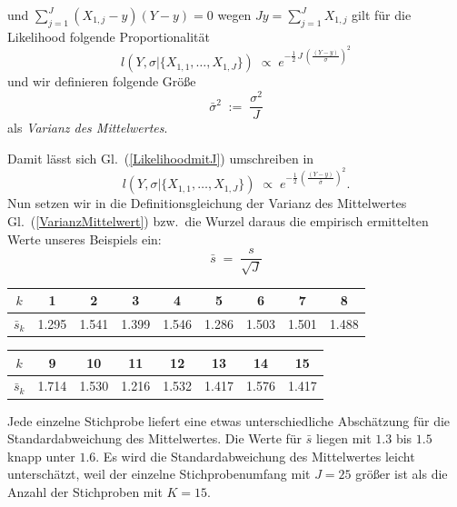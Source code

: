 und $\sum\limits_{j=1}^J (X_{1,j} - y) (Y - y) = 0$ wegen $J y = \sum\limits_{j=1}^J X_{1,j}$
gilt für die Likelihood folgende Proportionalität
\begin{equation}
l(Y, \sigma | \{X_{1,1}, \dots, X_{1,J}\}) \; \propto \;
 e^{- \frac{1}{2} \, J \, \left( \frac{(Y - y)}{\sigma} \right)^2 }
\label{LikelihoodmitJ}
\end{equation}
und wir definieren folgende Größe
\begin{equation}
\bar \sigma^2 \; := \; \frac{\sigma^2}{J}
\label{VarianzMittelwert}
\end{equation}
als \textsl{Varianz des Mittelwertes}.

Damit lässt sich Gl.~(\ref{LikelihoodmitJ}) umschreiben in
\begin{equation}
l(Y, \sigma | \{X_{1,1}, \dots, X_{1,J}\}) \; \propto \;
 e^{- \frac{1}{2} \, \left( \frac{(Y - y)}{\bar \sigma} \right)^2 } .
\end{equation}
Nun setzen wir in die Definitionsgleichung
der Varianz des Mittelwertes Gl.~(\ref{VarianzMittelwert}) bzw.\
die Wurzel daraus die empirisch ermittelten Werte unseres Beispiels ein:
\begin{equation}
\bar s \; = \; \frac{s}{\sqrt{J}}
\label{empirischeVarianzMittelwert}
\end{equation}

\begin{tabular}{c||c|c|c|c|c|c|c|c}
$k$   &  1     &    2   &    3   &   4    &    5   &   6    &   7    &   8   \\
\hline\hline
$\bar s_k$ &  1.295 &  1.541 &  1.399 &  1.546 &  1.286 &  1.503 &  1.501 &  1.488\\
\end{tabular}

\vspace{3mm}

\begin{tabular}{c||c|c|c|c|c|c|c}
$k$   &  9     &    10  &   11   &   12   &   13   &   14   &   15  \\
\hline\hline
$\bar s_k$ &  1.714 &  1.530 &  1.216 &  1.532 &  1.417 &  1.576 &  1.417\\
\end{tabular}

Jede einzelne Stichprobe liefert eine etwas unterschiedliche Abschätzung für die
Standardabweichung des Mittelwertes. Die Werte für $\bar s$ liegen mit $1.3$ bis $1.5$
knapp unter $1.6$. Es wird die Standardabweichung des Mittelwertes leicht unterschätzt, weil
der einzelne Stichprobenumfang mit $J = 25$ größer ist als die Anzahl der Stichproben mit
$K = 15$.

